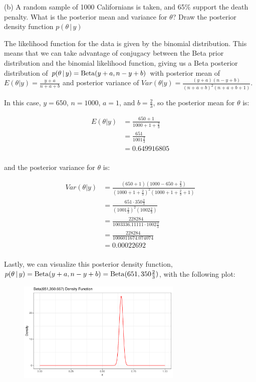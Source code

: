 \documentclass[12pt]{article}
\begin{document}
(b) A random sample of 1000 Californians is taken, and 65\% support the death penalty.  What is the posterior mean and variance for $\theta$? Draw the posterior density function $p(\theta \, | \, y)$

The likelihood function for the data is given by the binomial distribution. This means that we can take advantage of 
conjugacy between the Beta prior distribution and the binomial likelihood function, giving us a Beta posterior distribution 
of $p(\theta \, | \, y) = {\rm Beta}(y + a, n - y + b)$ with posterior mean of $E(\theta | y) = \frac{y + a}{n + a + b}$ and
posterior variance of $Var(\theta | y) = \frac{(y + a)(n - y + b)}{(n + a + b)^2(n + a + b + 1)}$.

In this case, $y = 650$, $n = 1000$, $a = 1$, and $b = \frac{2}{3}$, so the posterior mean for $\theta$ is:

\begin{align*}
E(\theta | y) &= \frac{650 + 1}{1000 + 1 + \frac{2}{3}} \\
&= \frac{651}{1001\frac{2}{3}} \\
&= 0.649916805 \\
\end{align*}

and the posterior variance for $\theta$ is:

\begin{align*}
Var(\theta | y) &= \frac{(650 + 1)(1000 - 650 + \frac{2}{3})}{(1000 + 1 + \frac{2}{3})^2(1000 + 1 + \frac{2}{3} + 1)} \\
&= \frac{651 \cdot 350\frac{2}{3}}{(1001\frac{2}{3})^2(1002\frac{2}{3})} \\
&= \frac{228284}{1003336.11111 \cdot 1002\frac{2}{3}} \\
&= \frac{228284}{1006011674.074074} \\
&= 0.00022692 \\
\end{align*}


Lastly, we can visualize this posterior density function, $p(\theta \, | \, y) = {\rm Beta}(y + a, n - y + b) = {\rm Beta}(651, 350\frac{2}{3})$,
with the following plot:

\begin{figure}[h]
    \centering
    \includegraphics[width=0.7\textwidth]{q3b_plot.pdf}
\end{figure}
\end{document}
